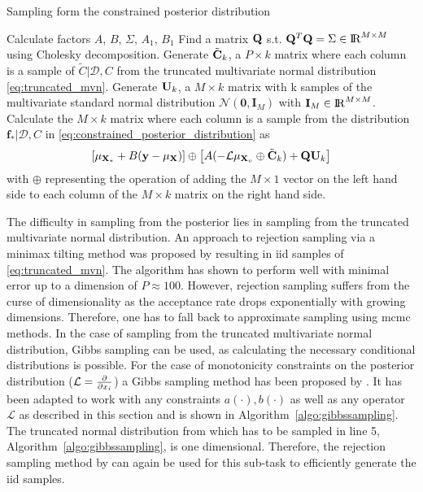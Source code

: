 \begin{algorithm}[h]
\centering
\caption{Sampling form the constrained posterior distribution \cite{Agrell_2019}}
\begin{algorithmic}[1]
\Require Calculate factors $A$, $B$, $\Sigma$, $A_1$, $B_1$
\State Find a matrix $\mathrm{\mathbf{Q}}$ s.t. $\mathrm{\mathbf{Q}}^T \mathrm{\mathbf{Q}} = \Sigma \in \mathrm{I\!R}^{M \times M}$ using Cholesky decomposition.
\State Generate $\tilde{\mathrm{\mathbf{C}}}_k$, a $P \times k$ matrix where each column is a sample of $\tilde{C} | \mathcal{D}, C$ from the truncated multivariate normal distribution \eqref{eq:truncated_mvn}.
\State Generate $\mathrm{\mathbf{U}}_k$, a $M \times k$ matrix with k samples of the multivariate standard normal distribution $\mathcal{N}(\mathbf{0}, \mathbf{I}_M)$ with $\mathbf{I}_M \in \mathrm{I\!R}^{M \times M}$.
\State Calculate the $M \times k$ matrix where each column is a sample from the distribution $\mathbf{f_*} | \mathcal{D}, C$ in \eqref{eq:constrained_posterior_distribution} as
\begin{equation}
    \left[\mu_{\mathbf{X}_*} + B (\mathbf{y} - \mu_{\mathbf{X}}) \right] \oplus \left[A(- \mathcal{L}\mu_{\mathbf{X}_v} \oplus \tilde{\mathrm{\mathbf{C}}}_k) +  \mathrm{\mathbf{Q}}\mathrm{\mathbf{U}}_k \right]
\end{equation}
with $\oplus$ representing the operation of adding the $M \times 1$ vector on the left hand side to each column of the $M\times k$ matrix on the right hand side.
\end{algorithmic}
\label{algo:constrained_posterior}
\end{algorithm}
The difficulty in sampling from the posterior lies in sampling from the truncated multivariate normal distribution. An approach to rejection sampling via a minimax tilting method was proposed by \textcite{Botev2016} resulting in iid samples of \eqref{eq:truncated_mvn}. The algorithm has shown to perform well with minimal error up to a dimension of $P \approx 100$. However, rejection sampling suffers from the curse of dimensionality as the acceptance rate drops exponentially with growing dimensions. Therefore, one has to fall back to approximate sampling using \gls{mcmc} methods. In the case of sampling from the truncated multivariate normal distribution, Gibbs sampling can be used, as calculating the necessary conditional distributions is possible. For the case of monotonicity constraints on the posterior distribution ($\mathcal{L}=\frac{\partial}{\partial x_i}$) a Gibbs sampling method has been proposed by \textcite{Wang_2016}. It has been adapted to work with any constraints $a(\cdot), b(\cdot)$ as well as any operator $\mathcal{L}$ as described in this section and is shown in Algorithm~\ref{algo:gibbssampling}. 
The truncated normal distribution from which has to be sampled in line 5, Algorithm~\ref{algo:gibbssampling}, is one dimensional. Therefore, the rejection sampling method by \textcite{Botev2016} can again be used for this sub-task to efficiently generate the iid samples.

